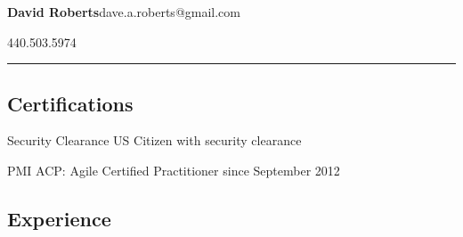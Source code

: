 \documentclass[10pt,letterpaper]{article}
\newenvironment{indentsection}[1]%
{\begin{list}{}%
	{\setlength{\leftmargin}{#1}}%
	\item[]%
}
{\end{list}}
\begin{document}
{\LARGE \textbf{{\color{blue!50!black}David Roberts}}}\hfill dave.a.roberts@gmail.com

{\hfill 440.503.5974}

\vspace{1em}
\hrule
\vspace{1em}

\subsection*{Certifications}

\begin{indentsection}{\parindent}
\begin{description*}
	\item[Security Clearance]
	US Citizen with {\color{blue} security clearance}
	\item[PMI ACP:]
	{\color{blue} Agile Certified Practitioner} since September 2012
\end{description*}
\end{indentsection}

\subsection*{Experience}
\end{document}
